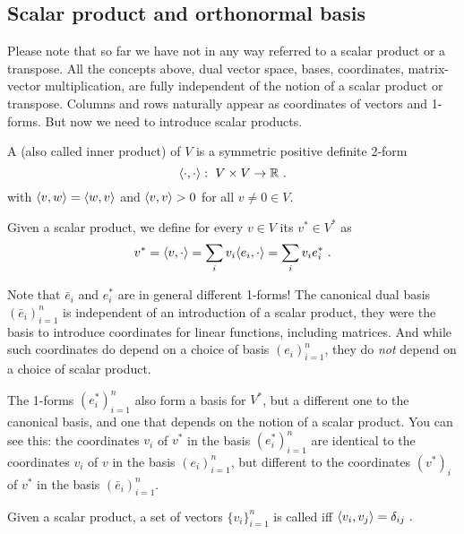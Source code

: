 \subsection{Scalar product and orthonormal basis}

Please note that so far we have not in any way referred to a scalar
product or a transpose. All the concepts above, dual vector space,
bases, coordinates, matrix-vector multiplication, are fully
independent of the notion of a scalar product or transpose. Columns
and rows naturally appear as coordinates of vectors and 1-forms. But
now we need to introduce scalar products.

\begin{myDefinition}
A  (also called inner product) of $V$ is a
symmetric positive definite 2-form
\begin{equation}
\langle\cdot,\cdot\rangle:~ V\times V \to {\mathbb{R}} ~.
\end{equation}
with $\langle v,w\rangle = \langle w,v\rangle$ and $\langle v,v\rangle > 0$ for all $v\not=0 \in V$.
\end{myDefinition}

\begin{myDefinition}
Given a scalar product, we define for every $v\in V$ its 
$v^*\in V^*$ as
\begin{equation}
v^* = \langle v, \cdot\rangle = \sum_i v_i \langle e_i,\cdot\rangle = \sum_i v_i e_i^* ~.
\end{equation}
\end{myDefinition}

Note that $\bar e_i$ and $e_i^*$ are in general different 1-forms! The canonical
dual basis $(\bar e_i)_{i=1}^n$ is independent of an introduction of a
scalar product, they were the basis to introduce coordinates for
linear functions, including matrices. And while such coordinates do depend
on a choice of basis $(e_i)_{i=1}^n$, they do \emph{not} depend on a choice
of scalar product.

The 1-forms $(e_i^*)_{i=1}^n$ also form a basis for $V^*$, but a different
one to the canonical basis, and one that depends on the notion of a
scalar product. You can see this: the coordinates $v_i$ of $v^*$ in
the basis $(e_i^*)_{i=1}^n$ are identical to the coordinates $v_i$ of $v$
in the basis $(e_i)_{i=1}^n$, but different to the coordinates $(v^*)_i$ of
$v^*$ in the basis $(\bar e_i)_{i=1}^n$.

\begin{myDefinition}
Given a scalar product, a set of vectors $\{v_i\}_{i=1}^n$ is
called  iff $\langle v_i,v_j\rangle = \delta_{ij} ~.$
\end{myDefinition}

